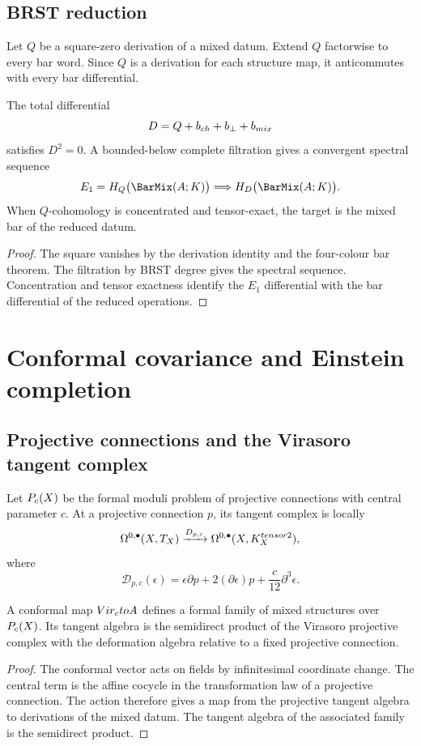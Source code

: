 \chapter{BRST reduction}
Let $Q$ be a square-zero derivation of a mixed datum.  Extend $Q$ factorwise to every bar word.  Since $Q$ is a derivation for each structure map, it anticommutes with every bar differential.

\begin{theorem}
The total differential
\[
 D=Q+b_{ch}+b_\perp+b_{mix}
\]
satisfies $D^2=0$.  A bounded-below complete filtration gives a convergent spectral sequence
\[
 E_1=H_Q\bigl(\BarMix(\mathbb A;K)\bigr)
 \Longrightarrow H_D\bigl(\BarMix(\mathbb A;K)\bigr).
\]
When $Q$-cohomology is concentrated and tensor-exact, the target is the mixed bar of the reduced datum.
\end{theorem}
\begin{proof}
The square vanishes by the derivation identity and the four-colour bar theorem.  The filtration by BRST degree gives the spectral sequence.  Concentration and tensor exactness identify the $E_1$ differential with the bar differential of the reduced operations.
\end{proof}

\part{Conformal covariance and Einstein completion}

\chapter{Projective connections and the Virasoro tangent complex}
Let $P_c(X)$ be the formal moduli problem of projective connections with central parameter $c$.  At a projective connection $p$, its tangent complex is locally
\[
 \Omega^{0,\bullet}(X,T_X)
 \xrightarrow{D_{p,c}}
 \Omega^{0,\bullet}(X,K_X^{tensor2}),
\]
where
\[
 \mathcal D_{p,c}(\epsilon)
 =\epsilon\partial p+2(\partial\epsilon)p+\frac{c}{12}\partial^3\epsilon.
\]

\begin{theorem}
A conformal map $Vir_cto A$ defines a formal family of mixed structures over $P_c(X)$.  Its tangent algebra is the semidirect product of the Virasoro projective complex with the deformation algebra relative to a fixed projective connection.
\end{theorem}
\begin{proof}
The conformal vector acts on fields by infinitesimal coordinate change.  The central term is the affine cocycle in the transformation law of a projective connection.  The action therefore gives a map from the projective tangent algebra to derivations of the mixed datum.  The tangent algebra of the associated family is the semidirect product.
\end{proof}


